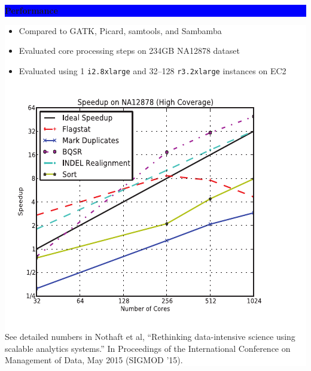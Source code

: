 \documentclass[11pt]{a0poster}
\begin{document}
{\begin{minipage}[t][2045pt][t]{\linewidth}
\begin{minipage}{0.3\linewidth}
\vspace{75pt}
\colorbox{Blue}{
\begin{minipage}{\linewidth}
\vspace{25pt}
\begin{center}
\Huge \bf \color{White} Performance
\end{center}
\vspace{10pt}
\end{minipage}
}
\colorbox{White}{
\begin{minipage}[t][1020pt][t]{\linewidth}
\color{Blue}
\vspace{20pt}
\LARGE
\begin{itemize}
\item Compared to GATK, Picard, samtools, and Sambamba
\item Evaluated core processing steps on 234GB NA12878 dataset
\item Evaluated using 1 \texttt{i2.8xlarge} and 32--128 \texttt{r3.2xlarge} instances on EC2
\end{itemize}
\begin{center}
\includegraphics[width=0.83\linewidth]{speedup_na12878.pdf}
\end{center}
\small See detailed numbers in Nothaft et al, ``Rethinking data-intensive science using scalable analytics systems.''
In Proceedings of the International Conference on Management of Data, May 2015 (SIGMOD '15).
\pagebreak
\end{minipage}
}
\pagebreak
\end{minipage}
\begin{minipage}{0.03\linewidth}
\hfill
\pagebreak
\end{minipage}
\begin{minipage}{0.6\linewidth}


\end{minipage}
\end{minipage}}
\end{document}
